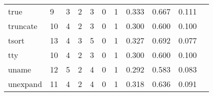 \begin{longtable}{lp{1.20cm}p{1.20cm}p{1.20cm}p{1.20cm}p{1.20cm}p{1.20cm}p{1.20cm}p{1.20cm}p{1.20cm}p{1.20cm}}
true      &                                     9 &                                                  3 &                                                  2 &                                                  3 &                                                  0 &                                                  1 &                                         0.333 &                                              0.667 &                                              0.111 \\
truncate  &                                    10 &                                                  4 &                                                  2 &                                                  3 &                                                  0 &                                                  1 &                                         0.300 &                                              0.600 &                                              0.100 \\
tsort     &                                    13 &                                                  4 &                                                  3 &                                                  5 &                                                  0 &                                                  1 &                                         0.327 &                                              0.692 &                                              0.077 \\
tty       &                                    10 &                                                  4 &                                                  2 &                                                  3 &                                                  0 &                                                  1 &                                         0.300 &                                              0.600 &                                              0.100 \\
uname     &                                    12 &                                                  5 &                                                  2 &                                                  4 &                                                  0 &                                                  1 &                                         0.292 &                                              0.583 &                                              0.083 \\
unexpand  &                                    11 &                                                  4 &                                                  2 &                                                  4 &                                                  0 &                                                  1 &                                         0.318 &                                              0.636 &                                              0.091 \\

\end{longtable}
